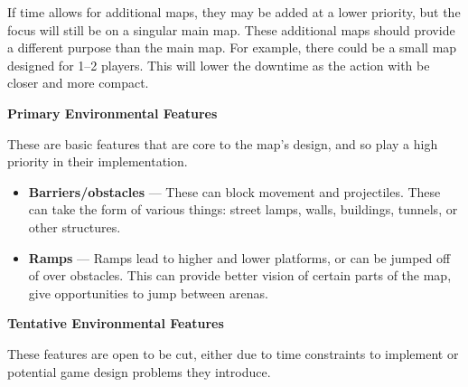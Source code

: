 \documentclass{article}
\theoremstyle{definition}
\begin{document}
If time allows for additional maps, they may be added at a lower priority, but
the focus will still be on a singular main map. These additional maps should
provide a different purpose than the main map. For example, there could be
a small map designed for 1--2 players. This will lower the downtime as the
action with be closer and more compact.

\textbf{Primary Environmental Features}

These are basic features that are core to the map's design, and so play a high
priority  in their implementation.

\begin{itemize}
  \item \textbf{Barriers/obstacles} --- These can block movement and
    projectiles. These can take the form of various things: street lamps,
    walls, buildings, tunnels, or other structures.
  \item \textbf{Ramps} --- Ramps lead to higher and lower platforms, or can be jumped
    off of over obstacles. This can provide better vision of certain parts of
    the map, give opportunities to jump between arenas.
\end{itemize}

\textbf{Tentative Environmental Features}

These features are open to be cut, either due to time constraints to implement
or potential game design problems they introduce.
\end{document}
